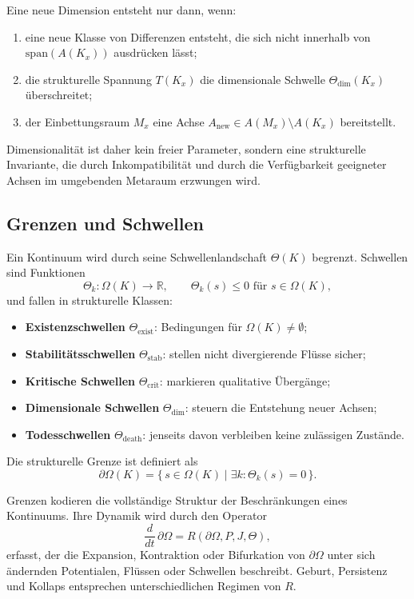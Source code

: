 Eine neue Dimension entsteht nur dann, wenn:

\begin{enumerate}
    \item eine neue Klasse von Differenzen entsteht, die sich nicht innerhalb von \(\mathrm{span}(A(K_x))\) ausdrücken lässt;
    \item die strukturelle Spannung \(T(K_x)\) die dimensionale Schwelle \(\Theta_{\mathrm{dim}}(K_x)\) überschreitet;
    \item der Einbettungsraum \(M_x\) eine Achse \(A_{\mathrm{new}}\in A(M_x)\setminus A(K_x)\) bereitstellt.
\end{enumerate}

Dimensionalität ist daher kein freier Parameter, sondern eine strukturelle Invariante, die durch Inkompatibilität und durch die Verfügbarkeit geeigneter Achsen im umgebenden Metaraum erzwungen wird.

\subsection{Grenzen und Schwellen}

Ein Kontinuum wird durch seine Schwellenlandschaft \(\Theta(K)\) begrenzt.
Schwellen sind Funktionen
\[
\Theta_k : \Omega(K) \to \mathbb{R},
\qquad
\Theta_k(s)\le 0 \text{ für } s\in\Omega(K),
\]
und fallen in strukturelle Klassen:

\begin{itemize}
    \item \textbf{Existenzschwellen} \(\Theta_{\mathrm{exist}}\): Bedingungen für \(\Omega(K)\neq\emptyset\);
    \item \textbf{Stabilitätsschwellen} \(\Theta_{\mathrm{stab}}\): stellen nicht divergierende Flüsse sicher;
    \item \textbf{Kritische Schwellen} \(\Theta_{\mathrm{crit}}\): markieren qualitative Übergänge;
    \item \textbf{Dimensionale Schwellen} \(\Theta_{\mathrm{dim}}\): steuern die Entstehung neuer Achsen;
    \item \textbf{Todesschwellen} \(\Theta_{\mathrm{death}}\): jenseits davon verbleiben keine zulässigen Zustände.
\end{itemize}

Die strukturelle Grenze ist definiert als
\[
\partial\Omega(K) = \{\, s\in\Omega(K) \mid \exists k: \Theta_k(s)=0 \,\}.
\]

Grenzen kodieren die vollständige Struktur der Beschränkungen eines Kontinuums.
Ihre Dynamik wird durch den Operator
\[
\frac{d}{dt}\,\partial\Omega = R(\partial\Omega, P, J, \Theta),
\]
erfasst, der die Expansion, Kontraktion oder Bifurkation von \(\partial\Omega\) unter sich ändernden Potentialen, Flüssen oder Schwellen beschreibt.
Geburt, Persistenz und Kollaps entsprechen unterschiedlichen Regimen von \(R\).

